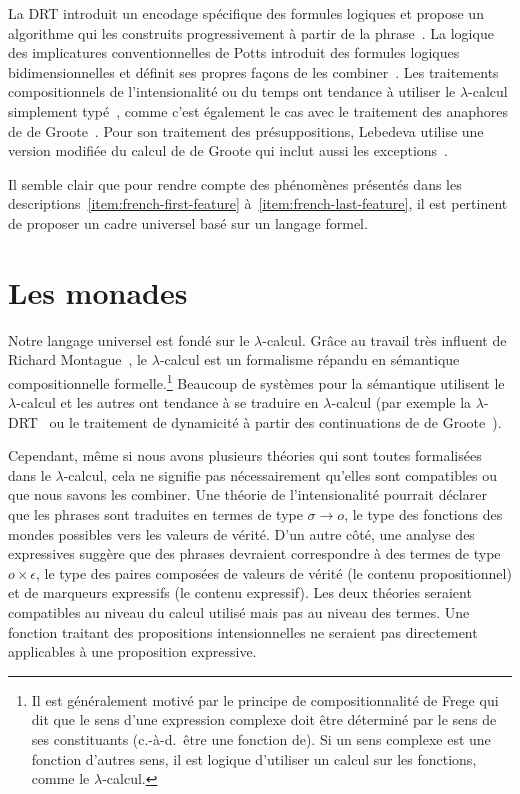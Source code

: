 La DRT introduit un encodage spécifique des formules logiques et propose un
algorithme qui les construits progressivement à partir de la phrase~\cite{kamp1993discourse}. La logique des implicatures conventionnelles de
Potts introduit des formules logiques bidimensionnelles et définit ses propres
façons de les combiner~\cite{potts2005logic}. Les traitements compositionnels
de l'intensionalité ou du temps ont tendance à utiliser le $\lambda$-calcul
simplement typé~\cite{ben2007semantics,de2013note}, comme c'est également le cas
avec le traitement des anaphores de de Groote~\cite{de2006towards}. Pour son traitement
des présuppositions, Lebedeva utilise une version modifiée du calcul de de Groote
qui inclut aussi les exceptions~\cite{lebedeva2012expression}.

Il semble clair que pour rendre compte des phénomènes présentés dans les descriptions~\ref{item:french-first-feature} à~\ref{item:french-last-feature}, il est pertinent de proposer un cadre universel basé sur un langage formel.

\section*{Les monades}

Notre langage universel est fondé sur le $\lambda$-calcul. Grâce au travail très
influent de Richard Montague~\cite{montague1973proper}, le $\lambda$-calcul est
un formalisme répandu en sémantique compositionnelle formelle.\footnote{Il est
  généralement motivé par le principe de compositionnalité de Frege qui dit que
  le sens d'une expression complexe doit être déterminé par le sens de ses
  constituants (c.-à-d.\ être une fonction de). Si un sens complexe est une
  fonction d'autres sens, il est logique d'utiliser un calcul sur les fonctions,
  comme le $\lambda$-calcul.} Beaucoup de systèmes pour la sémantique utilisent
le $\lambda$-calcul et les autres ont tendance à se traduire en $\lambda$-calcul
(par exemple la $\lambda$-DRT~\cite{kuschert1995type} ou le traitement de
dynamicité à partir des continuations de de Groote~\cite{de2006towards}).

Cependant, même si nous avons plusieurs théories qui sont toutes formalisées
dans le $\lambda$-calcul, cela ne signifie pas nécessairement qu'elles sont
compatibles ou que nous savons les combiner. Une théorie de l'intensionalité
pourrait déclarer que les phrases sont traduites en termes de type
$\sigma \to o$, le type des fonctions des mondes possibles vers les valeurs de
vérité. D'un autre côté, une analyse des expressives suggère que des phrases
devraient correspondre à des termes de type $o \times \epsilon$, le type des
paires composées de valeurs de vérité (le contenu propositionnel) et de marqueurs
expressifs (le contenu expressif). Les deux théories seraient compatibles au
niveau du calcul utilisé mais pas au niveau des termes. Une fonction
traitant des propositions intensionnelles ne seraient pas directement
applicables à une proposition expressive.

